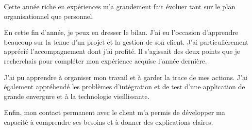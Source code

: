 Cette année riche en expériences m'a grandement fait évoluer tant sur le plan organisationnel que personnel.

En cette fin d'année, je peux en dresser le bilan. 
J'ai eu l'occasion d'apprendre beaucoup sur la tenue d'un projet et la gestion de son client. J'ai particulièrement apprécié l'accompagnement dont j'ai profité. Il s'agissait des deux points que je recherchais pour compléter mon expérience acquise l'année dernière.

J'ai pu apprendre à organiser mon travail et à garder la trace de mes actions. J'ai également appréhendé les problèmes d'intégration et de test d'une application de grande envergure et à la technologie vieillissante.

Enfin, mon contact permanent avec le client m'a permis de développer ma capacité à comprendre ses besoins et à donner des explications claires.
